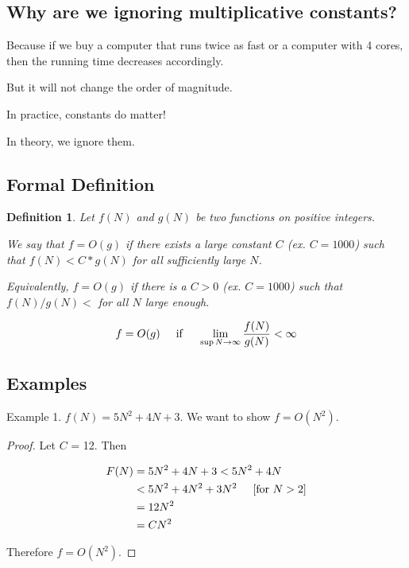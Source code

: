 \documentclass[12pt]{article}
\newtheorem{definition}{Definition}
\begin{document}
\subsection{Why are we ignoring multiplicative constants?}

Because if we buy a computer that runs twice as fast or a computer with 4 cores, then the running time decreases accordingly.

But it will not change the order of magnitude.

In practice, constants do matter!

In theory, we ignore them.

\subsection{Formal Definition}

\begin{definition}
Let $f(N)$ and $g(N)$ be two functions on positive integers.

We say that $f = O(g)$ if there exists a large constant $C$ (ex. $C = 1000$) such that $f(N) < C*g(N)$ for all sufficiently large $N$.

Equivalently, $f = O(g)$ if there is a $C > 0$ (ex. $C = 1000$) such that $f(N)/g(N) < $ for all $N$ large enough.

\begin{equation}
f = O(g) \hspace{5mm} \textnormal{if} \hspace{5mm} \lim_{\sup N \to \infty} \frac{f(N)}{g(N)} < \infty
\end{equation}

\end{definition}

\subsection{Examples}

Example 1. $f(N) = 5N^2 + 4N + 3$. We want to show $f = O(N^2)$.

\begin{proof}
Let $C$ = 12. Then

\begin{align*}
F(N) &= 5N^2 + 4N + 3 < 5N^2 + 4N \\
&< 5N^2 + 4N^2 + 3N^2 \hspace{5mm} [\textnormal{for $N > 2$}] \\
&= 12N^2 \\
&= CN^2
\end{align*}

Therefore $f = O(N^2)$.

\end{proof}
\end{document}
